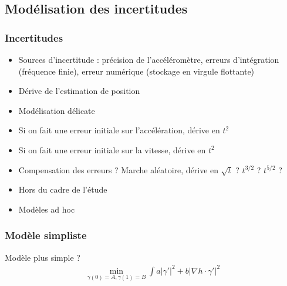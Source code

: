 \documentclass[11pt]{beamer}
\begin{document}
\subsection{Modélisation des incertitudes}
\begin{frame}
  \frametitle{Incertitudes}
\begin{itemize}
\item Sources d'incertitude : précision de l'accéléromètre, erreurs
  d'intégration (fréquence finie), erreur numérique (stockage en
  virgule flottante)
\item Dérive de l'estimation de position
\item Modélisation délicate
\item Si on fait une erreur initiale sur l'accélération, dérive en
  $t^{2}$
\item Si on fait une erreur initiale sur la vitesse, dérive en
  $t^{2}$
\item Compensation des erreurs ? Marche aléatoire, dérive en $\sqrt t$
  ? $t^{3/2}$ ? $t^{5/2}$ ?
\item Hors du cadre de l'étude
\item Modèles ad hoc
\end{itemize}
\end{frame}

\begin{frame}
  \frametitle{Modèle simpliste}
Modèle plus simple ?
\begin{align*}
  \min_{\gamma(0) = A, \gamma(1) = B} \int a |\gamma'|^{2} + b |\nabla
  h \cdot \gamma'|^{2}
\end{align*}
\end{frame}
\end{document}

